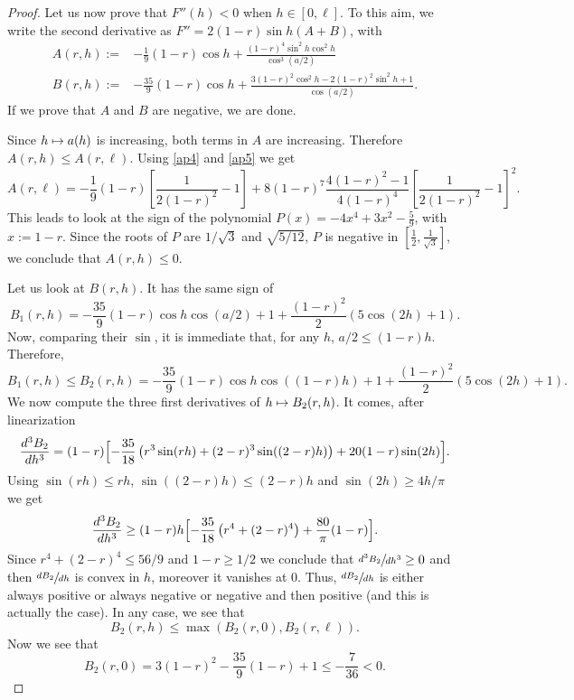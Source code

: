 \documentclass[JEP,XML,SOM,Unicode,NoFloatCountersInSection]{cedram}
\newcommand\mto{\mathchoice{\longmapsto}{\mapsto}{\mapsto}{\mapsto}}
\theoremstyle{plain}
\theoremstyle{definition}
\begin{document}
\begin{proof}
Let us now prove that $F''(h)<0$ when $h\in [0,\ell]$. To this aim, we write the second derivative as $F''=2(1-r)\sin h (A+B)$, with
\begin{align*}
A(r,h):=& -\frac{1}{9} (1-r) \cos h + \frac{(1-r)^4\sin^2 h \cos^2 h}{\cos^3(a/2)}
\\
B(r,h):=& -\frac{35}{9} (1-r)\cos h + \frac{3(1-r)^2\cos^2 h - 2 (1-r)^2\sin^2 h + 1}{\cos(a/2)}.
\end{align*}
If we prove that $A$ and $B$ are negative, we are done.

Since $h\mto a(h)$ is increasing, both terms in $A$ are increasing. Therefore
$A(r,h)\leq A(r,\ell)$. Using \eqref{ap4} and \eqref{ap5} we get
\[
A(r,\ell)=-\frac{1}{9}(1-r)\left[\frac{1}{2(1-r)^2}-1\right]+8(1-r)^7
\frac{4(1-r)^2-1}{4(1-r)^4}
\left[\frac{1}{2(1-r)^2}-1\right]^2.
\]
This leads to look at the sign of
the polynomial $P(x)=-4x^4+3x^2-\frac{5}{9}$, with $x:=1-r$. Since the roots of $P$
are $1/\sqrt{3}$ and $\sqrt{5/12}$, $P$ is negative in $[\frac{1}{2},\frac{1}{\sqrt{3}}]$, we conclude that $A(r,h)\leq 0$.

Let us look at $B(r,h)$. It has the same sign of\vspace*{-3pt}
\[
B_1(r,h)=-\frac{35}{9} (1-r)\cos h \cos(a/2) + 1 +\frac{(1-r)^2}{2}(5\cos(2h) +1).
\]
Now, comparing their $\sin$, it is immediate that, for any $h$, $a/2\leq (1-r)h$.
Therefore,
\[
B_1(r,h)\leq B_2(r,h)= -\frac{35}{9} (1-r)\cos h \cos((1-r)h) + 1 +\frac{(1-r)^2}{2}(5\cos(2h) +1).
\]
We now compute the three first derivatives of $h\mto B_2(r,h)$. It comes, after
linearization\vspace*{-3pt}
\[
\frac{d^3 B_2}{dh^3}=(1-r)\Bigl[-\frac{35}{18}\left(r^3\sin(rh)+(2-r)^3\sin((2-r)h)\right)
+20(1-r)\sin(2h)\Bigr].
\]
Using $\sin(rh)\leq rh$, $\sin((2-r)h)\leq (2-r)h$ and $\sin(2h)\geq 4h/\pi$
we get
\[
\frac{d^3 B_2}{d h^3}\geq (1-r)h\Bigl[-\frac{35}{18}\left(r^4+(2-r)^4\right)
+\frac{80}{\pi}(1-r)\Bigr].
\]
Since $r^4+(2-r)^4\leq 56/9$ and $1-r\geq 1/2$ we conclude that
$\sfrac{d^3 B_2}{dh^3} \geq 0$ and then $\sfrac{d B_2}{dh}$ is convex in $h$,
moreover it vanishes at $0$. Thus, $\sfrac{d B_2}{dh}$ is either always positive or always
negative or negative and then positive (and this is actually the case).
In any case, we see that\vspace*{-3pt}
\[
B_2(r,h)\leq \max\left(B_2(r,0),B_2(r,\ell)\right).
\]
Now we see that\vspace*{-3pt}
\[
B_2(r,0)=3(1-r)^2-\frac{35}{9}(1-r)+1 \leq -\frac{7}{36} <0.
\]


\end{proof}
\end{document}
